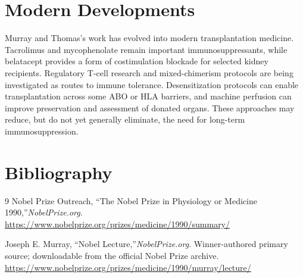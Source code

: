 \section{Modern Developments}

Murray and Thomas's work has evolved into modern transplantation medicine. Tacrolimus and mycophenolate remain important immunosuppressants, while belatacept provides a form of costimulation blockade for selected kidney recipients. Regulatory T-cell research and mixed-chimerism protocols are being investigated as routes to immune tolerance. Desensitization protocols can enable transplantation across some ABO or HLA barriers, and machine perfusion can improve preservation and assessment of donated organs. These approaches may reduce, but do not yet generally eliminate, the need for long-term immunosuppression.


\section{Bibliography}

\begin{thebibliography}{9}
Nobel Prize Outreach, ``The Nobel Prize in Physiology or Medicine 1990,''\emph{NobelPrize.org}.\\
\url{https://www.nobelprize.org/prizes/medicine/1990/summary/}

Joseph E. Murray, ``Nobel Lecture,''\emph{NobelPrize.org}. Winner-authored primary source; downloadable from the official Nobel Prize archive.\\
\url{https://www.nobelprize.org/prizes/medicine/1990/murray/lecture/}
\end{thebibliography}

